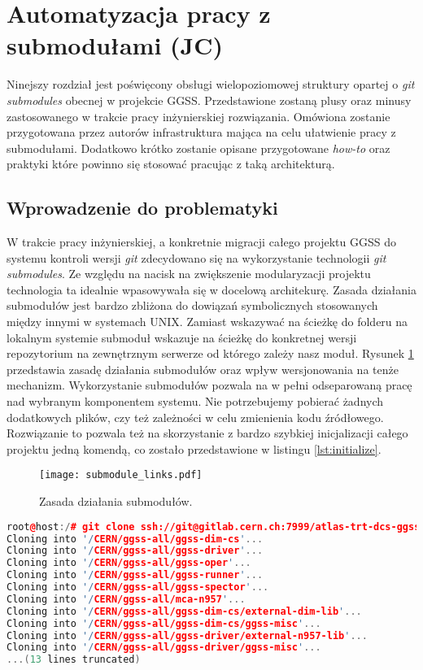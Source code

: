 \clearpage
\section{Automatyzacja pracy z submodułami (JC)}
\label{sec:gitio}

Ninejszy rozdział jest poświęcony obsługi wielopoziomowej struktury opartej o \emph{git submodules} obecnej w projekcie GGSS. Przedstawione zostaną plusy oraz minusy zastosowanego w trakcie pracy inżynierskiej rozwiązania. Omówiona zostanie przygotowana przez autorów infrastruktura mająca na celu ułatwienie pracy z submodułami. Dodatkowo krótko zostanie opisane przygotowane \emph{how-to} oraz praktyki które powinno się stosować pracując z taką architekturą.

\subsection{Wprowadzenie do problematyki}

W trakcie pracy inżynierskiej, a konkretnie migracji całego projektu GGSS do systemu kontroli wersji \emph{git} zdecydowano się na wykorzystanie technologii \emph{git submodules}. Ze względu na nacisk na zwiększenie modularyzacji projektu technologia ta idealnie wpasowywała się w docelową architekurę. Zasada działania submodułów jest bardzo zbliżona do dowiązań symbolicznych stosowanych między innymi w systemach UNIX. Zamiast wskazywać na ścieżkę do folderu na lokalnym systemie submoduł wskazuje na ścieżkę do konkretnej wersji repozytorium na zewnętrznym serwerze od którego zależy nasz moduł. Rysunek \ref{fig:submodules_links} przedstawia zasadę działania submodułów oraz wpływ wersjonowania na tenże mechanizm. Wykorzystanie submodułów pozwala na w pełni odseparowaną pracę nad wybranym komponentem systemu. Nie potrzebujemy pobierać żadnych dodatkowych plików, czy też zależności w celu zmienienia kodu źródłowego. Rozwiązanie to pozwala też na skorzystanie z bardzo szybkiej inicjalizacji całego projektu jedną komendą, co zostało przedstawione w listingu \ref{lst:initialize}.

\begin{figure}[H]
    \centering
    \texttt{[image: submodule\_links.pdf]}
    \caption{Zasada działania submodułów.}
    \label{fig:submodules_links}
\end{figure}

\begin{lstlisting}[language=c++, caption={Inicjalizacja pełnej sturktury projektu jedną komendą.}, label={lst:initialize}]
root@host:/# git clone ssh://git@gitlab.cern.ch:7999/atlas-trt-dcs-ggss/ggss-all.git && cd ggss-all && git submodule update --init --recursive
Cloning into '/CERN/ggss-all/ggss-dim-cs'...
Cloning into '/CERN/ggss-all/ggss-driver'...
Cloning into '/CERN/ggss-all/ggss-oper'...
Cloning into '/CERN/ggss-all/ggss-runner'...
Cloning into '/CERN/ggss-all/ggss-spector'...
Cloning into '/CERN/ggss-all/mca-n957'...
Cloning into '/CERN/ggss-all/ggss-dim-cs/external-dim-lib'...
Cloning into '/CERN/ggss-all/ggss-dim-cs/ggss-misc'...
Cloning into '/CERN/ggss-all/ggss-driver/external-n957-lib'...
Cloning into '/CERN/ggss-all/ggss-driver/ggss-misc'...
...(13 lines truncated)
\end{lstlisting}



